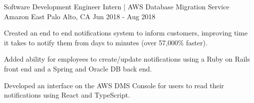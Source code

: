 \begin{cventries}
  \cventry
  {Software Development Engineer Intern | AWS Database Migration Service} %
  {Amazon} %
  {East Palo Alto, CA} %
  {Jun 2018 - Aug 2018} %
  {
    \begin{cvitems} %
      \item {Created an end to end notifications system to inform customers, improving time it takes to notify them from days to minutes (over 57,000\% faster).}
      \item {Added ability for employees to create/update notifications using a Ruby on Rails front end and a Spring and Oracle DB back end.}
      \item {Developed an interface on the AWS DMS Console for users to read their notifications using React and TypeScript.}
    \end{cvitems}
  }

\end{cventries}
